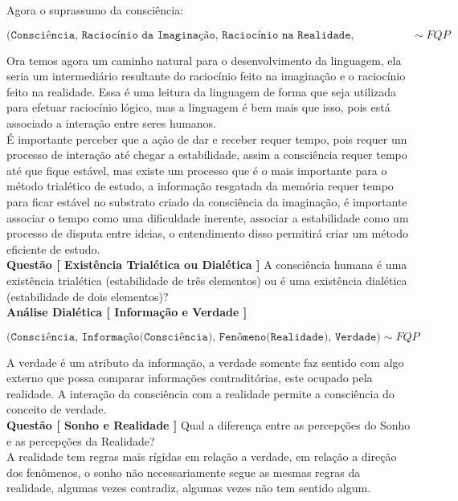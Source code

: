 Agora o suprassumo da consciência:

$$ \texttt{(Consciência, Raciocínio da Imaginação, Raciocínio na Realidade, Linguagem)} \sim FQP $$

\hrulefill

Ora temos agora um caminho natural para o desenvolvimento da linguagem, ela seria um intermediário resultante do raciocínio feito na imaginação e o raciocínio feito na realidade. Essa é uma leitura da linguagem de forma que seja utilizada para efetuar raciocínio lógico, mas a linguagem é bem mais que isso, pois está associado a interação entre seres humanos.\\

É importante perceber que a ação de dar e receber requer tempo, pois requer um processo de interação até chegar a estabilidade, assim a consciência requer tempo até que fique estável, mas existe um processo que é o mais importante para o método trialético de estudo, a informação resgatada da memória requer tempo para ficar estável no substrato criado da consciência da imaginação, é importante associar o tempo como uma dificuldade inerente, associar a estabilidade como um processo de disputa entre ideias, o entendimento disso permitirá criar um método eficiente de estudo.\\

\textbf{Questão [ Existência Trialética ou Dialética ]} A consciência humana é uma existência trialética (estabilidade de três elementos) ou é uma existência dialética (estabilidade de dois elementos)?\\

\textbf{Análise Dialética [ Informação e Verdade ]}

$$ \texttt{(Consciência, Informação(Consciência), Fenômeno(Realidade), Verdade)} \sim FQP $$

\hrulefill

A verdade é um atributo da informação, a verdade somente faz sentido com algo externo que possa comparar informações contraditórias, este ocupado pela realidade. A interação da consciência com a realidade permite a consciência do conceito de verdade.\\

\textbf{Questão [ Sonho e Realidade ]} Qual a diferença entre as percepções do Sonho e as percepções da Realidade?\\

A realidade tem regras mais rígidas em relação a verdade, em relação a direção dos fenômenos, o sonho não necessariamente segue as mesmas regras da realidade, algumas vezes contradiz, algumas vezes não tem sentido algum.\\

